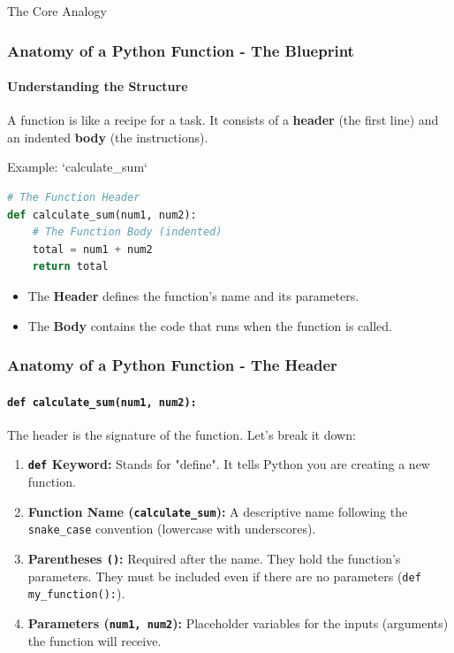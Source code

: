 \documentclass{beamer}
\begin{document}
\begin{frame}[fragile]
\begin{block}{The Core Analogy}
\begin{frame}[fragile]
    \frametitle{Anatomy of a Python Function - The Blueprint}
    \framesubtitle{Understanding the Structure}
    
    A function is like a recipe for a task. It consists of a \textbf{header} (the first line) and an indented \textbf{body} (the instructions).
    
    \begin{block}{Example: `calculate_sum`}
\begin{lstlisting}[language=Python]
# The Function Header
def calculate_sum(num1, num2):
    # The Function Body (indented)
    total = num1 + num2
    return total
\end{lstlisting}
    \end{block}
    
    \begin{itemize}
        \item The \textbf{Header} defines the function's name and its parameters.
        \item The \textbf{Body} contains the code that runs when the function is called.
    \end{itemize}
    
\end{frame}

\begin{frame}[fragile]
    \frametitle{Anatomy of a Python Function - The Header}
    \framesubtitle{\texttt{def calculate\_sum(num1, num2):}}
    
    The header is the signature of the function. Let's break it down:
    \begin{enumerate}
        \item \textbf{\texttt{def} Keyword:} Stands for "define". It tells Python you are creating a new function.
        
        \item \textbf{Function Name (\texttt{calculate\_sum}):} A descriptive name following the \texttt{snake\_case} convention (lowercase with underscores).
        
        \item \textbf{Parentheses \texttt{()}:} Required after the name. They hold the function's parameters. They must be included even if there are no parameters (\texttt{def my\_function():}).
        
        \item \textbf{Parameters (\texttt{num1, num2}):} Placeholder variables for the inputs (arguments) the function will receive.
        

\end{enumerate}
\end{frame}
\end{block}
\end{frame}
\end{document}
